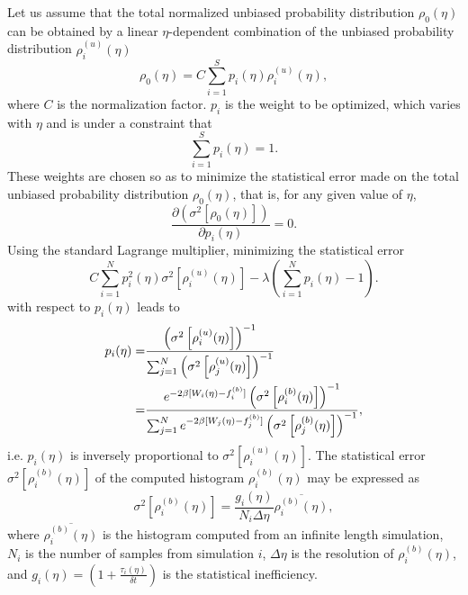 Let us assume that the total normalized unbiased probability distribution $\rho_{0}(\eta)$ can be obtained by a linear $\eta$-dependent combination of the unbiased probability distribution $\rho_{i}^{(u)}(\eta)$ 
\begin{equation}
\rho_{0}(\eta)=C\sum_{i=1}^{S}p_{i}(\eta)\rho_{i}^{(u)}(\eta),
\label{Eq:FEM:WHAM:unbias0}
\end{equation}  
where $C$ is the normalization factor. $p_i$ is the weight to be optimized, which varies with $\eta$ and is under a constraint that
\begin{equation}
\sum_{i=1}^{S}p_{i}(\eta)=1.
\label{Eq:FEM:WHAM:p1}
\end{equation}
These weights are chosen so as to minimize the statistical error made on the total unbiased probability distribution $\rho_{0}(\eta)$, that is, for any given value of $\eta$,
\begin{equation}
\frac{\partial(\sigma^2[\rho_{0}(\eta)])}{\partial p_{i}(\eta)}=0.
\label{Eq:FEM:WHAM:partialp}
\end{equation} 
Using the standard Lagrange multiplier, minimizing the statistical error
\begin{equation}
	C\sum_{i=1}^N p_i^2(\eta) \sigma^2\left[\rho_i^{(u)}(\eta)\right]-\lambda\left(\sum_{i=1}^N p_i(\eta)-1\right).
\end{equation}
with respect to $p_i(\eta)$ leads to
\begin{align}
	p_i(\eta)=&\frac{\left(\sigma^2\left[\rho_i^{(u)}(\eta)\right]\right)^{-1}}{\sum_{j=1}^N \left(\sigma^2\left[\rho_j^{(u)}(\eta)\right]\right)^{-1}}\notag\\
	              =&\frac{e^{-2\beta[W_{i}(\eta)-f_{i}^{(b)}]}\left(\sigma^2\left[\rho_{i}^{(b)}(\eta)\right]\right)^{-1}}{\sum_{j=1}^N e^{-2\beta[W_{j}(\eta)-f_{j}^{(b)}]}\left(\sigma^2\left[\rho_{j}^{(b)}(\eta)\right]\right)^{-1}},
\end{align}
i.e. $p_i(\eta)$ is inversely proportional to $\sigma^2\left[\rho_i^{(u)}(\eta)\right]$.
The statistical error $\sigma^2\left[\rho_{i}^{(b)}(\eta)\right]$ of the computed histogram $\rho_{i}^{(b)}(\eta)$ may be expressed as
\begin{equation}
	\sigma^2\left[\rho_{i}^{(b)}(\eta)\right]=\frac{g_i(\eta)}{N_i\Delta \eta}\overline{\rho_{i}^{(b)}(\eta)},
\end{equation}
where $\overline{\rho_{i}^{(b)}(\eta)}$ is the histogram computed from an infinite length simulation, $N_i$ is the number of samples from simulation $i$, $\Delta \eta$ is the resolution of $\rho_{i}^{(b)}(\eta)$, and $g_i(\eta)=\left(1+\frac{\tau_i(\eta)}{\delta t}\right)$ is the statistical inefficiency.

